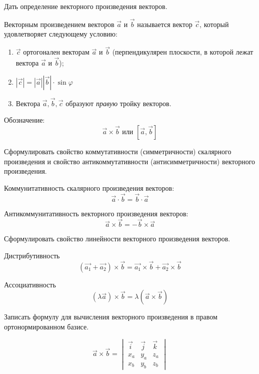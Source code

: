 \begin{question}
  Дать определение векторного произведения векторов.
\end{question}
\begin{answer}
  Векторным произведением векторов $\vec{a}$ и $\vec{b}$ называется вектор $\vec{c}$, который удовлетворяет следующему условию:
  \begin{enumerate}
    \item $\vec{c}$ ортогонален векторам $\vec{a}$ и $\vec{b}$ (перпендикулярен плоскости, в которой лежат вектора $\vec{a}$ и $\vec{b}$);
    \item $|\vec{c}| = |\vec{a}| |\vec{b}| \cdot \sin \varphi$
    \item Вектора $\vec{a}, \vec{b}, \vec{c}$ образуют \textit{правую} тройку векторов.
  \end{enumerate}
  Обозначение: \[
    \vec{a} \times \vec{b} \text{ или } [\vec{a}, \vec{b}]
  \]   
\end{answer}

\begin{question}
  Сформулировать свойство коммутативности (симметричности) скалярного произведения и свойство антикоммутативности (антисимметричности) векторного произведения.
\end{question}
\begin{answer}
  Коммунитативность скалярного произведения векторов: \[
    \vec{a} \cdot \vec{b} = \vec{b} \cdot \vec{a}
  \] 

  Антикоммунитативность векторного произведения векторов: \[
    \vec{a} \times \vec{b} = - \vec{b} \times \vec{a}  
  \] 
\end{answer}

\begin{question}
  Сформулировать свойство линейности векторного произведения векторов.
\end{question}
\begin{answer}
  Дистрибутивность \[
    (\vec{a_1} + \vec{a_2}) \times \vec{b} = \vec{a_1} \times \vec{b} + \vec{a_2} \times  \vec{b} 
  \]  

  Ассоциативность \[
    (\lambda \vec{a}) \times \vec{b} = \lambda (\vec{a} \times \vec{b})  
  \]  
\end{answer}

\begin{question}
  Записать формулу для вычисления векторного произведения в правом ортонормированном базисе.
\end{question}
\begin{answer}
  \[
  \vec{a} \times \vec{b} = 
  \begin{vmatrix}
    \vec{i} & \vec{j} & \vec{k} \\
    x_a & y_a & z_a \\
    x_b & y_b & z_b 
  \end{vmatrix}
  \] 
\end{answer}

